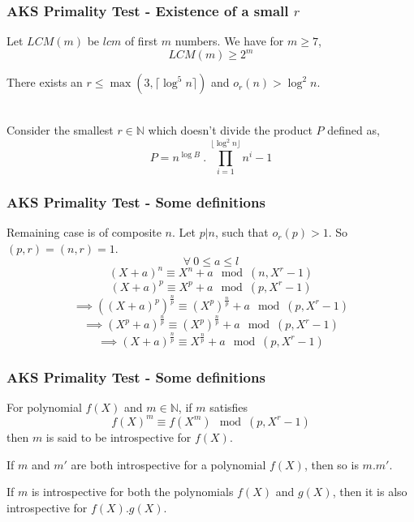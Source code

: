 \documentclass{beamer}
\begin{document}
\begin{frame}
\frametitle{AKS Primality Test - Existence of a small $r$}

\begin{lemma}
\label{lemma:LCMLemma}
Let $LCM(m)$ be $lcm$ of first $m$ numbers. We have for $m \geq 7$,
\[LCM(m) \geq 2^m\]
\end{lemma}

\begin{lemma}
\label{lemma:AKSLemma2}
There exists an $r \leq \max(3, \lceil \log^5 n \rceil)$ and $o_r(n) > \log^2 n$.
\end{lemma}
\ 
\\[3mm]
Consider the smallest $r \in \mathbb{N}$ which doesn't divide the product $P$ defined as,
\[P = n^{\log B}\ .\ \prod_{i=1}^{\lfloor \log^2 n \rfloor}{n^i-1} \]

\end{frame}

\begin{frame}
\frametitle{AKS Primality Test - Some definitions}
Remaining case is of composite $n$. Let $p | n$, such that $o_r(p) > 1$. So $(p,r) = (n,r) = 1$.
\[\forall\ 0 \leq a \leq l\]
\[(X+a)^n \equiv X^n + a \mod (n, X^r - 1)\]
\[(X+a)^p \equiv X^p + a \mod (p,X^r-1)\]
\[\implies ((X+a)^p)^{\frac{n}{p}} \equiv (X^p)^{\frac{n}{p}} + a \mod (p, X^r - 1)\]
\[\implies (X^p+a)^{\frac{n}{p}} \equiv (X^p)^{\frac{n}{p}} + a \mod (p, X^r - 1)\]
\[\implies (X+a)^{\frac{n}{p}} \equiv X^{\frac{n}{p}} + a \mod (p, X^r - 1)\]
\end{frame}

\begin{frame}
\frametitle{AKS Primality Test - Some definitions}
\begin{definition}
\label{definition:introspective}
For polynomial $f(X)$ and $m \in \mathbb{N}$, if $m$ satisfies
\[f(X)^m \equiv f(X^m) \mod (p,X^r-1)\]
then $m$ is said to be introspective for $f(X)$.
\end{definition}

\begin{lemma}
\label{lemma:IntrospectiveLemma1}
If $m$ and $m'$ are both introspective for a polynomial $f(X)$, then so is $m . m'$.
\end{lemma}

\begin{lemma}
\label{lemma:IntrospectiveLemma2}
If $m$ is introspective for both the polynomials $f(X)$ and $g(X)$, then it is also introspective for $f(X) . g(X)$.
\end{lemma}
\end{frame}
\end{document}
